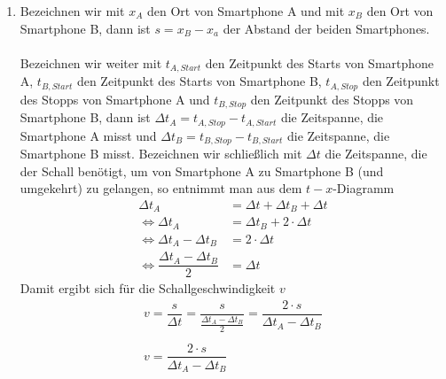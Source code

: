 \documentclass[12pt,oneside]{scrartcl}
\begin{document}
\begin{enumerate}
\item Bezeichnen wir mit $x_A$ den Ort von Smartphone A und mit $x_B$ den Ort von Smartphone B, dann ist $s = x_B - x_a$ der Abstand der beiden Smartphones.\\\\
Bezeichnen wir weiter mit $t_{A,Start}$ den Zeitpunkt des Starts von Smartphone A, $t_{B,Start}$ den Zeitpunkt des Starts von Smartphone B, $t_{A,Stop}$ den Zeitpunkt des Stopps von Smartphone A und $t_{B,Stop}$ den Zeitpunkt des Stopps von Smartphone B, dann ist $\Delta t_A = t_{A,Stop} - t_{A,Start}$ die Zeitspanne, die Smartphone A misst und $\Delta t_B = t_{B,Stop} - t_{B,Start}$ die Zeitspanne, die Smartphone B misst.\newpage
Bezeichnen wir schließlich mit $\Delta t$ die Zeitspanne, die der Schall benötigt, um von Smartphone A zu Smartphone B (und umgekehrt) zu gelangen, so entnimmt man aus dem $t-x$-Diagramm
\begin{align*}
\Delta t_A&=\Delta t+\Delta t_B +\Delta t\\
\Leftrightarrow \Delta t_A&=\Delta t_B + 2\cdot\Delta t\\
\Leftrightarrow \Delta t_A-\Delta t_B&=2\cdot\Delta t\\
\Leftrightarrow \dfrac{\Delta t_A-\Delta t_B}{2}&=\Delta t
\end{align*}
Damit ergibt sich für die Schallgeschwindigkeit $v$
\begin{align*}
v=\dfrac{s}{\Delta t}=\dfrac{s}{\frac{\Delta t_A-\Delta t_B}{2}}=\dfrac{2\cdot s}{\Delta t_A-\Delta t_B}\\
\\
\boxed{v=\dfrac{2\cdot s}{\Delta t_A-\Delta t_B}}
\end{align*}
\end{enumerate}
\end{document}
